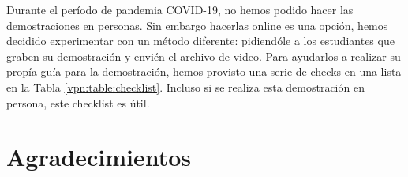 Durante el período de pandemia COVID-19, no hemos podido hacer las demostraciones en personas. Sin embargo hacerlas online es una opción, hemos decidido experimentar con un método diferente: pidiendóle a los estudiantes que graben su demostración y envién el archivo de video. Para ayudarlos a realizar su propía guía para la demostración, hemos provisto una serie de checks en una lista en la Tabla \ref{vpn:table:checklist}. Incluso si se realiza esta demostración en persona, este checklist es útil.




\section*{Agradecimientos}







